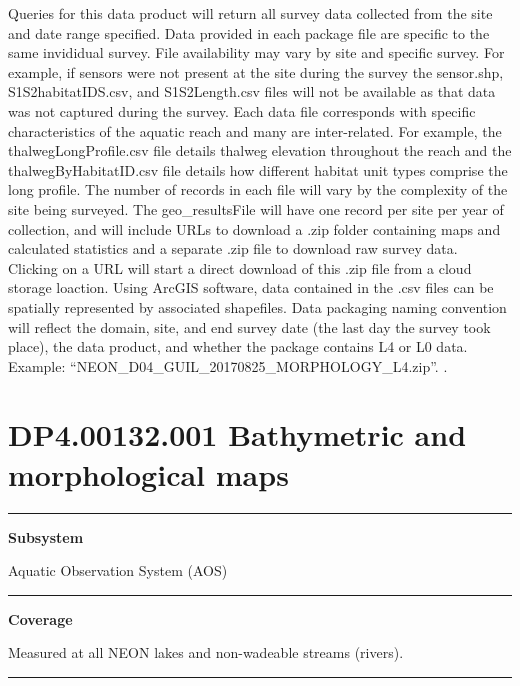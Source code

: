 \documentclass[]{article}
\begin{document}
Queries for this data product will return all survey data collected from
the site and date range specified. Data provided in each package file
are specific to the same invididual survey. File availability may vary
by site and specific survey. For example, if sensors were not present at
the site during the survey the sensor.shp, S1S2habitatIDS.csv, and
S1S2Length.csv files will not be available as that data was not captured
during the survey. Each data file corresponds with specific
characteristics of the aquatic reach and many are inter-related. For
example, the thalwegLongProfile.csv file details thalweg elevation
throughout the reach and the thalwegByHabitatID.csv file details how
different habitat unit types comprise the long profile. The number of
records in each file will vary by the complexity of the site being
surveyed. The geo\_resultsFile will have one record per site per year of
collection, and will include URLs to download a .zip folder containing
maps and calculated statistics and a separate .zip file to download raw
survey data. Clicking on a URL will start a direct download of this .zip
file from a cloud storage loaction. Using ArcGIS software, data
contained in the .csv files can be spatially represented by associated
shapefiles. Data packaging naming convention will reflect the domain,
site, and end survey date (the last day the survey took place), the data
product, and whether the package contains L4 or L0 data. Example:
``NEON\_D04\_GUIL\_20170825\_MORPHOLOGY\_L4.zip''. \newpage
.

\section{DP4.00132.001 Bathymetric and morphological
maps}\label{dp4.00132.001-bathymetric-and-morphological-maps}

\begin{center}\rule{0.5\linewidth}{\linethickness}\end{center}

\textbf{Subsystem}

Aquatic Observation System (AOS)

\begin{center}\rule{0.5\linewidth}{\linethickness}\end{center}

\textbf{Coverage}

Measured at all NEON lakes and non-wadeable streams (rivers).

\begin{center}\rule{0.5\linewidth}{\linethickness}\end{center}
\end{document}

